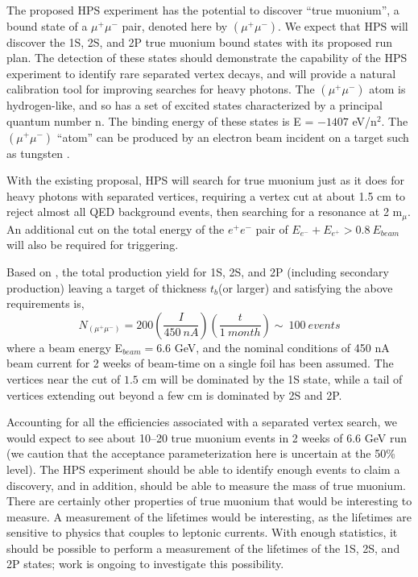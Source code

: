 The proposed HPS experiment has the potential to discover ``true muonium'', a bound state of a
$\mu^+ \mu^-$ pair, denoted here by $(\mu^+ \mu^-)$. 
We expect that HPS will discover the 1S, 2S, and 2P true muonium bound states with its proposed run plan. 
The detection of these states should demonstrate the capability of the HPS experiment 
to identify rare separated vertex decays, and will provide a natural calibration 
tool for improving searches for heavy photons.
The $(\mu^+ \mu^-)$ atom is hydrogen-like, and so has a set of excited states characterized by a principal quantum number n. 
The binding energy of these states is E = $-1407$ eV/n$^2$. The $(\mu^+ \mu^-)$ ``atom'' can be produced by an electron beam incident on a target such 
as tungsten \cite{Holvik:1986ty,ArteagaRomero:2000yh}. 

With the existing proposal, HPS will search for true muonium
just as it does for heavy photons with separated vertices, requiring a vertex cut at about 1.5 cm to reject almost all
QED background events, then searching for a resonance at 2 m$_{\mu}$. An additional cut 
on the total energy of the $e^+e^-$ pair of $E_{e^-}+E_{e^+}> 0.8 \ E_{beam}$ will also be required
for triggering. 

Based on \cite{Banburski:2012tk}, the total production yield for 1S, 2S, and 2P (including secondary production)
leaving a target of thickness $t_b$(or larger) and satisfying the above requirements is,
\begin{equation}
N_{(\mu^+ \mu^-)} = 200 \left( \frac{I}{450 \ nA} \right) \left( \frac{t}{1 \ month} \right)\sim ~ 100 ~events 
\end{equation}
%
where a beam energy E$_{beam} = 6.6$ GeV, and the nominal conditions
of 450 nA beam current for 2 weeks of beam-time on a single foil has been assumed.
The vertices near the cut of $1.5$ cm will be dominated by the 1S state, while 
a tail of vertices extending out beyond a few cm is dominated by 2S and 2P. 

Accounting for all the efficiencies associated with a separated vertex search, we would expect to see about 10--20 true muonium events in 2 weeks of $6.6$ GeV run
(we caution that the acceptance parameterization here is uncertain at the 50\% level).
The HPS experiment should be able to identify enough events to claim a discovery, and in addition, should be able to measure the mass of true muonium.  There are certainly other properties of true muonium that would be interesting to measure.  A measurement of the lifetimes would be interesting, as the lifetimes are sensitive to physics that couples to leptonic currents.  With enough statistics, it should be possible to perform a measurement of the lifetimes of the 1S, 2S, and 2P states; work is ongoing to investigate this possibility.  

